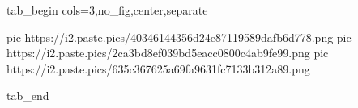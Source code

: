  
 
 
 
 


\ifcmt
  tab_begin cols=3,no_fig,center,separate


		 pic https://i2.paste.pics/40346144356d24e87119589dafb6d778.png
		 pic https://i2.paste.pics/2ca3bd8ef039bd5eacc0800c4ab9fe99.png
		 pic https://i2.paste.pics/635c367625a69fa9631fc7133b312a89.png

  tab_end
\fi
